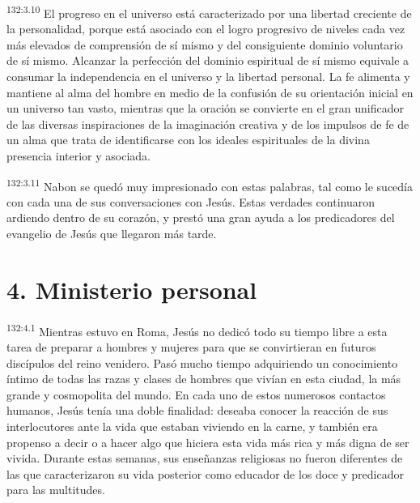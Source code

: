 \par 
\textsuperscript{132:3.10} El progreso en el universo está caracterizado por una libertad creciente de la personalidad, porque está asociado con el logro progresivo de niveles cada vez más elevados de comprensión de sí mismo y del consiguiente dominio voluntario de sí mismo. Alcanzar la perfección del dominio espiritual de sí mismo equivale a consumar la independencia en el universo y la libertad personal. La fe alimenta y mantiene al alma del hombre en medio de la confusión de su orientación inicial en un universo tan vasto, mientras que la oración se convierte en el gran unificador de las diversas inspiraciones de la imaginación creativa y de los impulsos de fe de un alma que trata de identificarse con los ideales espirituales de la divina presencia interior y asociada.

\par 
\textsuperscript{132:3.11} Nabon se quedó muy impresionado con estas palabras, tal como le sucedía con cada una de sus conversaciones con Jesús. Estas verdades continuaron ardiendo dentro de su corazón, y prestó una gran ayuda a los predicadores del evangelio de Jesús que llegaron más tarde.

\section*{4. Ministerio personal}
\par 
\textsuperscript{132:4.1} Mientras estuvo en Roma, Jesús no dedicó todo su tiempo libre a esta tarea de preparar a hombres y mujeres para que se convirtieran en futuros discípulos del reino venidero. Pasó mucho tiempo adquiriendo un conocimiento íntimo de todas las razas y clases de hombres que vivían en esta ciudad, la más grande y cosmopolita del mundo. En cada uno de estos numerosos contactos humanos, Jesús tenía una doble finalidad: deseaba conocer la reacción de sus interlocutores ante la vida que estaban viviendo en la carne, y también era propenso a decir o a hacer algo que hiciera esta vida más rica y más digna de ser vivida. Durante estas semanas, sus enseñanzas religiosas no fueron diferentes de las que caracterizaron su vida posterior como educador de los doce y predicador para las multitudes.

